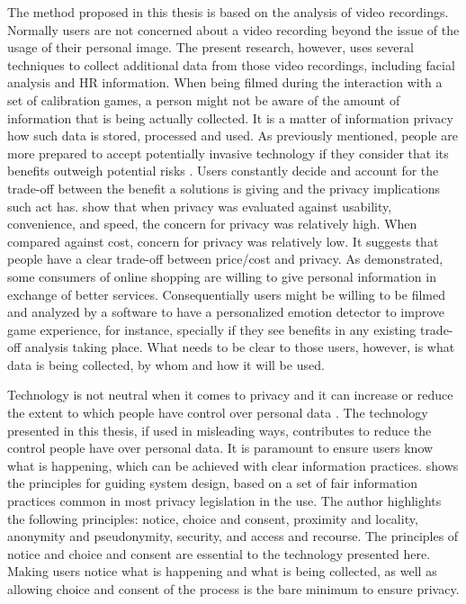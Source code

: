 The method proposed in this thesis is based on the analysis of video recordings. Normally users are not concerned about a video recording beyond the issue of the usage of their personal image. The present research, however, uses several techniques to collect additional data from those video recordings, including facial analysis and HR information. When being filmed during the interaction with a set of calibration games, a person might not be aware of the amount of information that is being actually collected. It is a matter of information privacy how such data is stored, processed and used. As previously mentioned, people are more prepared to accept potentially invasive technology if they consider that its benefits outweigh potential risks \parencite{ladd1991computers}. Users constantly decide and account for the trade-off between the benefit a solutions is giving and the privacy implications such act has. \textcite{nguyen2016effects} show that when privacy was evaluated against usability, convenience, and speed, the concern for privacy was relatively high. When compared against cost, concern for privacy was relatively low. It suggests that people have a clear trade-off between price/cost and privacy. As \textcite{awad2006personalization} demonstrated, some consumers of online shopping are willing to give personal information in exchange of better services. Consequentially users might be willing to be filmed and analyzed by a software to have a personalized emotion detector to improve game experience, for instance, specially if they see benefits in any existing trade-off analysis taking place. What needs to be clear to those users, however, is what data is being collected, by whom and how it will be used.

Technology is not neutral when it comes to privacy and it can increase or reduce the extent to which people have control over personal data \parencite{bellotti1993design}. The technology presented in this thesis, if used in misleading ways, contributes to reduce the control people have over personal data. It is paramount to ensure users know what is happening, which can be achieved with clear information practices. \textcite{langheinrich2001privacy} shows the principles for guiding system design, based on a set of fair information practices common in most privacy legislation in the use. The author highlights the following principles: notice, choice and consent, proximity and locality, anonymity and pseudonymity, security, and access and recourse. The principles of notice and choice and consent are essential to the technology presented here. Making users notice what is happening and what is being collected, as well as allowing choice and consent of the process is the bare minimum to ensure privacy.
